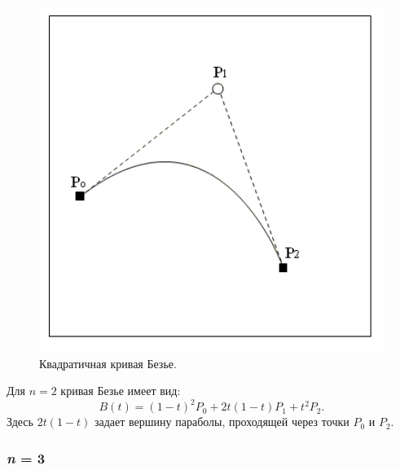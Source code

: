 \begin{figure}[H]
    \begin{center}
        \begin{minipage}[h]{0.4\linewidth}
            \includegraphics[width=1\textwidth]{TrueType_2_Arc.png}
            \caption{Квадратичная кривая Безье.}
            \label{ris:arc}
        \end{minipage}
    \end{center}
\end{figure}

Для \(n = 2\) кривая Безье имеет вид:
\[
    B(t) = (1-t)^2 P_0 + 2t(1-t)P_1 + t^2 P_2.
\]
Здесь \(2t(1-t)\) задает вершину параболы, проходящей через точки \(P_0\) и \(P_2\).
\subsubsection*{\textit{n} = 3}

